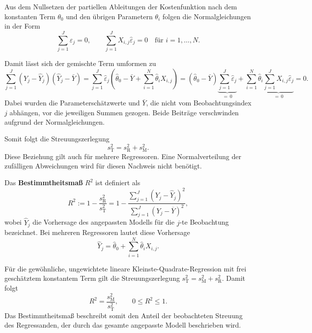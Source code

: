 Aus dem Nullsetzen der partiellen Ableitungen der
Kostenfunktion nach dem konstanten Term $\theta_0$
und den übrigen Parametern $\theta_i$ folgen
die Normalgleichungen in der Form
\begin{equation}
  \sum_{j=1}^{J}\hat\varepsilon_j=0,
  \qquad
  \sum_{j=1}^{J}X_{i,j}\hat\varepsilon_j=0
  \quad\text{für }i=1,\ldots,N.
  \label{eq:normalgleichungen_residuen}
\end{equation}

Damit lässt sich der gemischte Term umformen zu
\begin{equation}
  \sum_{j=1}^{J}
    (Y_j-\widehat Y_j)(\widehat Y_j-\bar Y)
  =
    \sum_{j=1}^{J}\hat\varepsilon_j
    \left(
      \hat\theta_0-\bar Y
      +\sum_{i=1}^{N}\hat\theta_iX_{i,j}
    \right)
 =
    (\hat\theta_0-\bar Y)
    \underbrace{
      \sum_{j=1}^{J}\hat\varepsilon_j
    }_{=\,0}
    +
    \sum_{i=1}^{N}\hat\theta_i
    \underbrace{
      \sum_{j=1}^{J}X_{i,j}\hat\varepsilon_j
    }_{=\,0}
 =0.
\end{equation}
Dabei wurden die Parameterschätzwerte und $\bar Y$,
die nicht vom Beobachtungsindex $j$ abhängen, vor die
jeweiligen Summen gezogen. Beide Beiträge verschwinden
aufgrund der Normalgleichungen.

Somit folgt die Streuungszerlegung
\begin{equation}
  \boxed{
    s_{\mathrm T}^2
    =s_{\mathrm R}^2+s_{\mathrm M}^2.
  }
\label{eq:totEmpVarianz}
\end{equation}
Diese Beziehung gilt auch für mehrere Regressoren.
Eine Normalverteilung der zufälligen Abweichungen
wird für diesen Nachweis nicht benötigt.

Das \textbf{Bestimmtheitsmaß} $R^2$ ist definiert als
\begin{equation}
  R^2
  :=1-\frac{s_{\mathrm R}^2}{s_{\mathrm T}^2}
  =1-
  \frac{\sum_{j=1}^{J}(Y_j-\widehat Y_j)^2}
       {\sum_{j=1}^{J}(Y_j-\overline Y)^2},
\end{equation}
wobei $\widehat Y_j$ die Vorhersage des angepassten Modells
für die $j$-te Beobachtung bezeichnet. Bei mehreren
Regressoren lautet diese Vorhersage
\begin{equation}
  \widehat Y_j
  =\hat\theta_0
   +\sum_{i=1}^{N}\hat\theta_iX_{i,j}.
\end{equation}

Für die gewöhnliche, ungewichtete lineare
Kleinste-Quadrate-Regression mit frei geschätztem
konstantem Term gilt die Streuungszerlegung
$s_{\mathrm T}^2=s_{\mathrm M}^2+s_{\mathrm R}^2$.
Damit folgt
\begin{equation}
  R^2=\frac{s_{\mathrm M}^2}{s_{\mathrm T}^2},
  \qquad 0\le R^2\le1.
\end{equation}
Das Bestimmtheitsmaß beschreibt somit den Anteil der
beobachteten Streuung des Regressanden, der durch das
gesamte angepasste Modell beschrieben wird.

